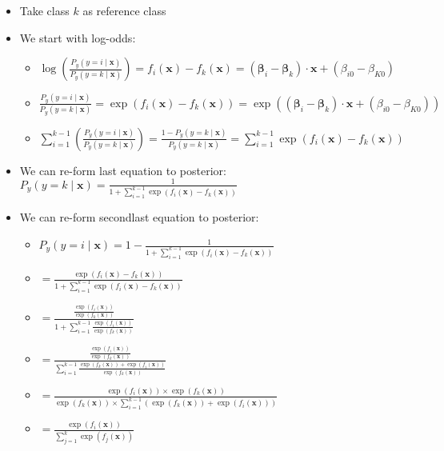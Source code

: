 \begin{itemize}
    \item Take class $k$ as reference class
    \item We start with log-odds:
    \begin{itemize}
        \item $\log\left(\frac{P_y(y = i \mid \boldsymbol{x})}{P_y(y = k \mid \boldsymbol{x})}\right) = f_i(\boldsymbol{x}) - f_k(\boldsymbol{x}) = (\boldsymbol{\beta}_i - \boldsymbol{\beta}_k) \cdot \boldsymbol{x} + (\beta_{i0} - \beta_{K0})$
        \item $\frac{P_y(y = i \mid \boldsymbol{x})}{P_y(y = k \mid \boldsymbol{x})} = \exp(f_i(\boldsymbol{x}) - f_k(\boldsymbol{x})) = \exp((\boldsymbol{\beta}_i - \boldsymbol{\beta}_k) \cdot \boldsymbol{x} + (\beta_{i0} - \beta_{K0}))$
        \item $\sum_{i=1}^{k-1} (\frac{P_y(y = i \mid \boldsymbol{x})}{P_y(y = k \mid \boldsymbol{x})}) = \frac{1 - P_y(y = k \mid \boldsymbol{x})}{P_y(y = k \mid \boldsymbol{x})} = \sum_{i=1}^{k-1} \exp(f_i(\boldsymbol{x}) - f_k(\boldsymbol{x}))$
    \end{itemize}
    \item We can re-form last equation to posterior: $P_y(y = k \mid \boldsymbol{x}) = \frac{1}{1 + \sum_{i=1}^{k-1} \exp(f_i(\boldsymbol{x}) - f_k(\boldsymbol{x}))}$
    \item We can re-form secondlast equation to posterior:
    \begin{itemize}
        \item $P_y(y = i \mid \boldsymbol{x}) = 1 - \frac{1}{1 + \sum_{i=1}^{k-1} \exp(f_i(\boldsymbol{x}) - f_k(\boldsymbol{x}))}$
        \item $= \frac{\exp(f_i(\boldsymbol{x}) - f_k(\boldsymbol{x}))}{1 + \sum_{i=1}^{k-1} \exp(f_i(\boldsymbol{x}) - f_k(\boldsymbol{x}))}$
        \item $= \frac{\frac{\exp(f_i(\boldsymbol{x}))}{\exp(f_k(\boldsymbol{x}))}}{1+ \sum_{i=1}^{k-1} \frac{\exp(f_i(\boldsymbol{x}))}{\exp(f_k(\boldsymbol{x}))}}$
        \item $= \frac{\frac{\exp(f_i(\boldsymbol{x}))}{\exp(f_k(\boldsymbol{x}))}}{ \sum_{i=1}^{k-1} \frac{\exp(f_k(\boldsymbol{x})) + \exp(f_i(\boldsymbol{x}))}{\exp(f_k(\boldsymbol{x}))}}$
        \item $= \frac{\exp(f_i(\boldsymbol{x})) \times \exp(f_k(\boldsymbol{x}))}{\exp(f_k(\boldsymbol{x})) \times \sum_{i=1}^{k-1}( \exp(f_k(\boldsymbol{x})) + \exp(f_i(\boldsymbol{x})) )}$
        \item $= \frac{\exp(f_i(\boldsymbol{x}))}{\sum_{j=1}^k \exp(f_j(\boldsymbol{x}))}$
    \end{itemize}
\end{itemize}
